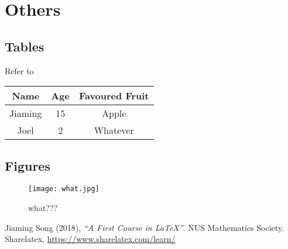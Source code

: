 \documentclass{article} %
\begin{document}
	\newpage
	\section{Others}
		\subsection{Tables}
		Refer to \cite{latex-course} %
		\begin{center} %
			\begin{tabular}{|c|c|c|} %
			\hline  %
			Name & Age & Favoured Fruit\\
			\hline
			Jiaming & 15 & Apple\\
			Joel & 2 & Whatever\\
			\hline
			\end{tabular}
		\end{center}
		\subsection{Figures}
		\begin{figure}[H] %
		\centering 
			\texttt{[image: what.jpg]} %
			\caption{what???}
		\end{figure}
			
			
	\begin{thebibliography}{100} %
		 Jiaming Song (2018), \emph{``A First Course in \LaTeX{}''}. NUS Mathematics Society.
		 Sharelatex, \url{https://www.sharelatex.com/learn/}
	\end{thebibliography}
	
\end{document}
